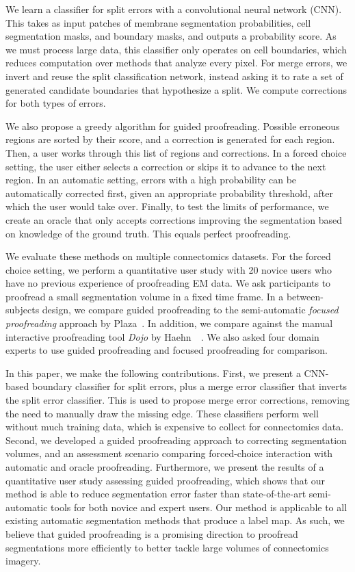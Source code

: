 We learn a classifier for split errors with a convolutional neural network
(CNN). This takes as input patches of membrane segmentation probabilities, cell
segmentation masks, and boundary masks, and outputs a probability score. As we
must process large data, this classifier only operates on cell boundaries, which
reduces computation over methods that analyze every pixel. For merge errors, we
invert and reuse the split classification network, instead asking it to rate a
set of generated candidate boundaries that hypothesize a split. We compute
corrections for both types of errors.

We also propose a greedy algorithm for guided proofreading. Possible erroneous
regions are sorted by their score, and a correction is generated for each
region. Then, a user works through this list of regions and corrections. In a
forced choice setting, the user either selects a correction or skips it to
advance to the next region. In an automatic setting, errors with a high
probability can be automatically corrected first, given an appropriate
probability threshold, after which the user would take over. Finally, to test
the limits of performance, we create an oracle that only accepts corrections
improving the segmentation based on knowledge of the ground truth. This equals
perfect proofreading.

We evaluate these methods on multiple connectomics datasets. For the forced
choice setting, we perform a quantitative user study with 20 novice users who
have no previous experience of proofreading EM data. We ask participants to
proofread a small segmentation volume in a fixed time frame. In a
between-subjects design, we compare guided proofreading to the semi-automatic
\textit{focused proofreading} approach by Plaza~\cite{focused_proofreading}. In
addition, we compare against the manual interactive proofreading tool
\textit{Dojo} by Haehn~\etal~\cite{haehn_dojo_2014}. We also asked four domain
experts to use guided proofreading and focused proofreading for comparison.

In this paper, we make the following contributions.
%
First, we present a CNN-based boundary classifier for split errors, plus a merge
error classifier that inverts the split error classifier. This is used to
propose merge error corrections, removing the need to manually draw the missing
edge. These classifiers perform well without much training data, which is
expensive to collect for connectomics data.
%
Second, we developed a guided proofreading approach to correcting segmentation
volumes, and an assessment scenario comparing forced-choice interaction with
automatic and oracle proofreading.
%
Furthermore, we present the results of a quantitative user study assessing
guided proofreading, which shows that our method is able to reduce segmentation
error faster than state-of-the-art semi-automatic tools for both novice and
expert users.
%
Our method is applicable to all existing automatic segmentation methods that
produce a label map. As such, we believe that guided proofreading is a promising
direction to proofread segmentations more efficiently to better tackle large
volumes of connectomics imagery.

